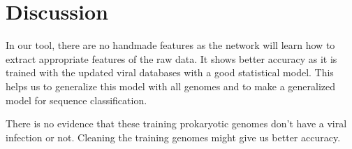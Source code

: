 \documentclass[conference]{IEEEtran}
\begin{document}


\section{Discussion}

In our tool, there are no handmade features as the network will learn how to extract appropriate features of the raw data. It shows better accuracy as it is trained with the updated viral databases with a good statistical model. This helps us to generalize this model with all genomes and to make a generalized model for sequence classification. %

There is no evidence that these training prokaryotic genomes don't have a viral infection or not. Cleaning the training genomes might give us better accuracy.%
\end{document}
